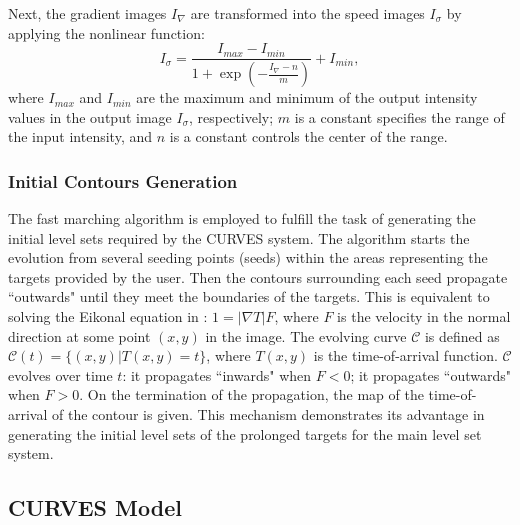 Next, the gradient images $I_{\nabla}$ are transformed into the speed images $I_{\sigma}$ by applying the nonlinear function:
\begin{equation}
\label{eqn:coronary_sigmoid}
I_{\sigma} = \frac{I_{max} - I_{min}}{1 + \exp\left(-\frac{I_{\nabla} - n}{m}\right)} + I_{min},
\end{equation}
where $I_{max}$ and $I_{min}$ are the maximum and minimum of the output intensity values in the output image $I_{\sigma}$, respectively; $m$ is a constant specifies the range of the input intensity, and $n$ is a constant controls the center of the range.

\subsubsection{Initial Contours Generation}
\label{subsubsec:coronary_initial_contours}

The fast marching algorithm \cite{Sethian1999} is employed to fulfill the task of generating the initial level sets required by the CURVES system.
The algorithm starts the evolution from several seeding points (seeds) within the areas representing the targets provided by the user.
Then the contours surrounding each seed propagate ``outwards" until they meet the boundaries of the targets.
This is equivalent to solving the Eikonal equation in \cite{Sethian1999}: $1 = | \nabla T | F$, %
where $F$ is the velocity in the normal direction at some point $(x,y)$ in the image.
The evolving curve $\mathcal{C}$ is defined as $\mathcal{C}(t) = \{(x,y) | T(x,y) = t\}$, %
where $T(x,y)$ is the time-of-arrival function.
$\mathcal{C}$ evolves over time $t$: it propagates ``inwards" when $F < 0$; it propagates ``outwards" when $F > 0$.
On the termination of the propagation, the map of the time-of-arrival of the contour is given.
This mechanism demonstrates its advantage in generating the initial level sets of the prolonged targets for the main level set system.

\subsection{CURVES Model}
\label{subsec:coronary_CURVES}

